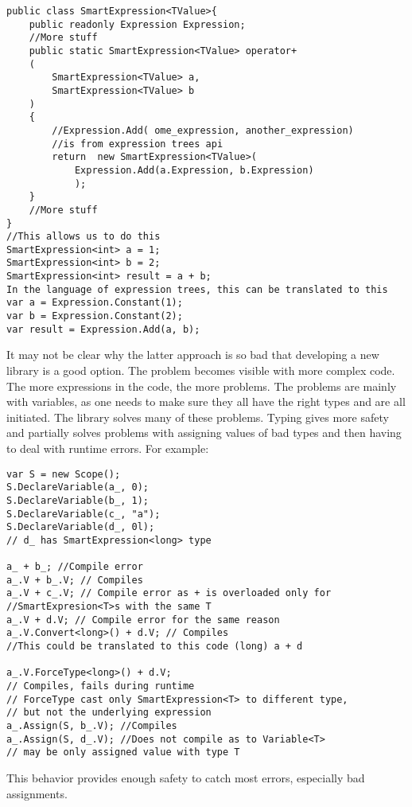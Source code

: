 \begin{lstlisting}
public class SmartExpression<TValue>{
    public readonly Expression Expression;
    //More stuff
    public static SmartExpression<TValue> operator+
    (
        SmartExpression<TValue> a, 
        SmartExpression<TValue> b
    )
    {
        //Expression.Add( ome_expression, another_expression) 
        //is from expression trees api
        return  new SmartExpression<TValue>(
            Expression.Add(a.Expression, b.Expression)
            );
    }
    //More stuff
}
//This allows us to do this
SmartExpression<int> a = 1;
SmartExpression<int> b = 2;
SmartExpression<int> result = a + b;
In the language of expression trees, this can be translated to this
var a = Expression.Constant(1);
var b = Expression.Constant(2);
var result = Expression.Add(a, b);
\end{lstlisting}
It may not be clear why the latter approach is so bad that developing a new library is a good option. The problem becomes visible with more complex code. The more expressions in the code, the more problems. The problems are mainly with variables, as one needs to make sure they all have the right types and are all initiated. The library solves many of these problems. Typing gives more safety and partially solves problems with assigning values of bad types and then having to deal with runtime errors. For example:
\begin{lstlisting}
var S = new Scope();
S.DeclareVariable(a_, 0);
S.DeclareVariable(b_, 1);
S.DeclareVariable(c_, "a");
S.DeclareVariable(d_, 0l); 
// d_ has SmartExpression<long> type

a_ + b_; //Compile error
a_.V + b_.V; // Compiles
a_.V + c_.V; // Compile error as + is overloaded only for 
//SmartExpresion<T>s with the same T
a_.V + d.V; // Compile error for the same reason
a_.V.Convert<long>() + d.V; // Compiles
//This could be translated to this code (long) a + d 

a_.V.ForceType<long>() + d.V;
// Compiles, fails during runtime
// ForceType cast only SmartExpression<T> to different type,
// but not the underlying expression
a_.Assign(S, b_.V); //Compiles
a_.Assign(S, d_.V); //Does not compile as to Variable<T> 
// may be only assigned value with type T
\end{lstlisting}
This behavior provides enough safety to catch most errors, especially bad assignments.

